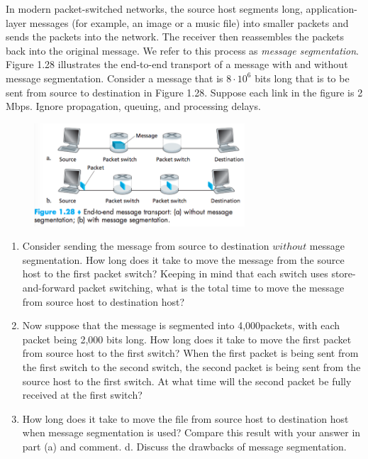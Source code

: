 \documentclass[10pt,spanish]{article}
\numberwithin{figure}{section} %
\newcommand{\italic}[1]{\textit{#1}} %
\begin{document}
In modern packet-switched networks, the source host segments long, application-layer messages (for example, an image or a music file) into smaller packets and sends the packets into the network. The receiver then reassembles the packets back into the original message. We refer to this process as \italic{message segmentation}. Figure 1.28 illustrates the end-to-end transport of a message with and without message segmentation. Consider a message that is $8 \cdot 10^6$ bits long that is to be sent from source to destination in Figure 1.28. Suppose each link in the figure is 2 Mbps. Ignore propagation, queuing, and processing delays.

\begin{figure}[H]
\centering
\includegraphics[width=0.7\textwidth]{Practico1/Fig1-28.png}
\end{figure}

\begin{enumerate}
\item Consider sending the message from source to destination $without$ message segmentation. How long does it take to move the message from the source host to the first packet switch? Keeping in mind that each switch uses store-and-forward packet switching, what is the total time to move the message from source host to destination host?
\item Now suppose that the message is segmented into 4,000packets, with each packet being 2,000 bits long. How long does it take to move the first packet from source host to the first switch? When the first packet is being sent from the first switch to the second switch, the second packet is being sent from the source host to the first switch. At what time will the second packet be fully received at the first switch?
\item How long does it take to move the file from source host to destination host when message segmentation is used? Compare this result with your answer in part (a) and comment.
d. Discuss the drawbacks of message segmentation.
\end{enumerate}
\end{document}
